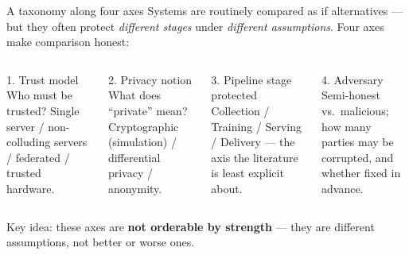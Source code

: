 \documentclass[10pt,aspectratio=169]{beamer}
\begin{document}
\begin{frame}{A taxonomy along four axes}
  Systems are routinely compared as if alternatives --- but they often protect
  \emph{different stages} under \emph{different assumptions}. Four axes make comparison honest:
 
  \vspace{0.4em}
  \begin{columns}[T]
      \begin{block}{1. Trust model}
        \footnotesize Who must be trusted? Single server / non-colluding servers /
        federated / trusted hardware.
      \end{block}
      \begin{block}{2. Privacy notion}
        \footnotesize What does ``private'' mean? Cryptographic (simulation)
        / differential privacy / anonymity.
      \end{block}
      \begin{block}{3. Pipeline stage protected}
        \footnotesize Collection / Training / Serving / Delivery --- the axis
        the literature is least explicit about.
      \end{block}
      \begin{block}{4. Adversary}
        \footnotesize Semi-honest vs.\ malicious; how many parties may be
        corrupted, and whether fixed in advance.
      \end{block}
  \end{columns}
 
  \vspace{0.5em}
  \begin{center}\small
  \alert{Key idea:} these axes are \textbf{not orderable by strength} --- they are
  different assumptions, not better or worse ones.
  \end{center}
\end{frame}
 
\end{document}
